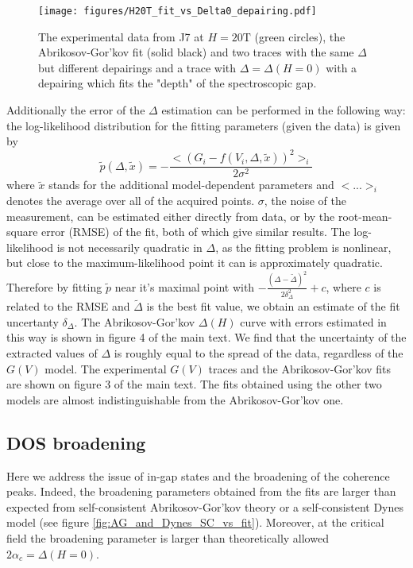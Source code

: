 \documentclass[showpacs,superscriptaddress,onecolumn,prb]{revtex4}
\begin{document}
\begin{figure}[h]
	\centering
	\texttt{[image: figures/H20T\_fit\_vs\_Delta0\_depairing.pdf]}
	\caption{The experimental data from J7 at $H=20\mathrm{T}$ (green circles), the Abrikosov-Gor'kov fit (solid black) and two traces with the same $\Delta$ but different depairings and a trace with $\Delta=\Delta(H=0)$ with a depairing which fits the "depth" of the spectroscopic gap.
	}
	\label{fig:H20T_fit}
\end{figure}

Additionally the error of the $\Delta$ estimation can be performed in the following way: the log-likelihood distribution for the fitting parameters (given the data) is given by 
$$\tilde{p}(\Delta,\tilde{x}) = - \frac{ <(G_i - f(V_i,\Delta,\tilde{x}))^2>_i}{2\sigma^2}$$ where $\tilde{x}$ stands for the additional model-dependent parameters and $< ...>_i$ denotes the average over all of the acquired points. $\sigma$, the noise of the measurement, can be estimated either directly from  data, or  by the root-mean-square error (RMSE) of the fit, both of which give similar results. The log-likelihood is not necessarily quadratic in $\Delta$, as the fitting problem is nonlinear, but close to the maximum-likelihood point it can is approximately quadratic.
Therefore by fitting $\tilde{p}$ near it's maximal point with $-\frac{ (\Delta - \tilde{\Delta})^2}{2\delta_\Delta^2} + c$, where $c$ is related to the RMSE and $\tilde{\Delta}$ is the best fit value, we obtain an estimate of the fit uncertanty $\delta_\Delta$. The Abrikosov-Gor'kov $\Delta(H)$ curve with errors estimated in this way is shown in figure 4 of the main text. We find that the uncertainty of the extracted values of $\Delta$ is roughly equal to the spread of the data, regardless of the $G(V)$ model. The experimental $G(V)$ traces and the Abrikosov-Gor'kov fits are shown on figure 3 of the main text. The fits obtained using the other two models are almost indistinguishable from the Abrikosov-Gor'kov one. 

\subsection{DOS broadening}\label{partI:DOSbroadening}

Here we address the issue of in-gap states and the broadening of the coherence peaks. Indeed, the broadening parameters obtained from the fits are larger than expected from self-consistent Abrikosov-Gor'kov theory \cite{abrikosov1961zh} or a self-consistent Dynes model \cite{herman2016microscopic} (see figure \ref{fig:AG_and_Dynes_SC_vs_fit}). Moreover, at the critical field the broadening parameter is larger than theoretically allowed $2\alpha_c=\Delta(H=0)$. 
\end{document}
